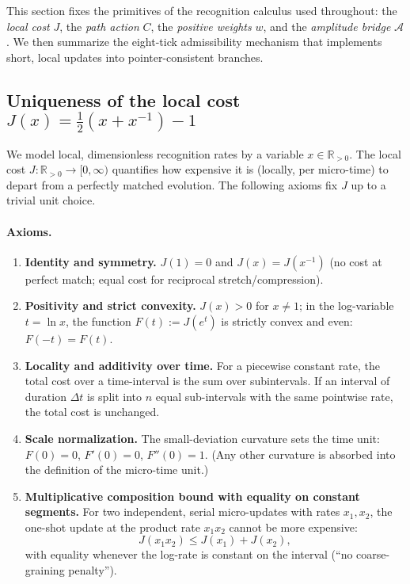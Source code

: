 \documentclass[11pt,letterpaper]{article}
\theoremstyle{definition}
\begin{document}
This section fixes the primitives of the recognition calculus used throughout: the \emph{local cost} \(J\), the \emph{path action} \(C\), the \emph{positive weights} \(w\), and the \emph{amplitude bridge} \(\mathcal A\). We then summarize the eight-tick admissibility mechanism that implements short, local updates into pointer-consistent branches.

\subsection{Uniqueness of the local cost \(J(x)=\frac12(x+x^{-1})-1\)}
We model local, dimensionless recognition rates by a variable \(x\in\mathbb R_{>0}\). The local cost \(J:\mathbb R_{>0}\!\to\![0,\infty)\) quantifies how expensive it is (locally, per micro-time) to depart from a perfectly matched evolution. The following axioms fix \(J\) up to a trivial unit choice.

\paragraph{Axioms.}
\begin{enumerate}
\item \textbf{Identity and symmetry.} \(J(1)=0\) and \(J(x)=J(x^{-1})\) (no cost at perfect match; equal cost for reciprocal stretch/compression).
\item \textbf{Positivity and strict convexity.} \(J(x)>0\) for \(x\neq 1\); in the log-variable \(t=\ln x\), the function \(F(t):=J(e^t)\) is strictly convex and even: \(F(-t)=F(t)\).
\item \textbf{Locality and additivity over time.} For a piecewise constant rate, the total cost over a time-interval is the sum over subintervals. If an interval of duration \(\Delta t\) is split into \(n\) equal sub-intervals with the same pointwise rate, the total cost is unchanged.
\item \textbf{Scale normalization.} The small-deviation curvature sets the time unit: \(F(0)=0\), \(F'(0)=0\), \(F''(0)=1\). (Any other curvature is absorbed into the definition of the micro-time unit.)
\item \textbf{Multiplicative composition bound with equality on constant segments.} For two independent, serial micro-updates with rates \(x_1,x_2\), the one-shot update at the product rate \(x_1x_2\) cannot be more expensive: 
\[
J(x_1x_2)\le J(x_1)+J(x_2),
\]
with equality whenever the log-rate is constant on the interval (``no coarse-graining penalty'').
\end{enumerate}
\end{document}
